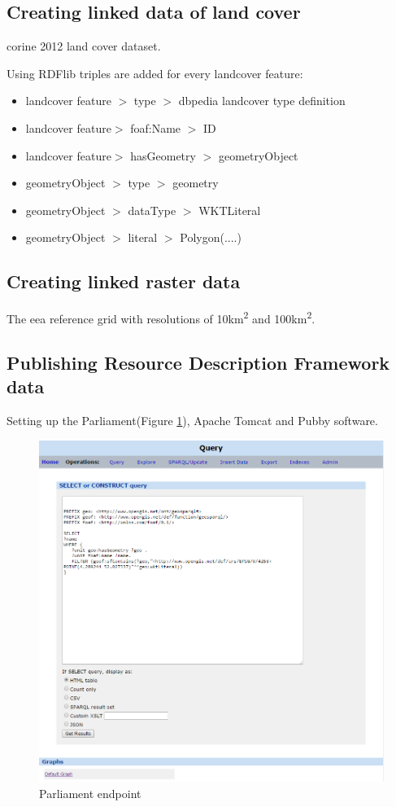 \subsection{Creating linked data of land cover}
\ac{corine} 2012 land cover dataset. 

Using RDFlib triples are added for every landcover feature: 
\begin{itemize}
	\item landcover feature $>$ type $>$ dbpedia landcover type definition
	\item landcover feature$>$ foaf:Name $>$ ID
	\item landcover feature$>$ hasGeometry $>$ geometryObject
	\item geometryObject $>$ type $>$ geometry
	\item geometryObject $>$ dataType $>$ WKTLiteral
	\item geometryObject $>$ literal $>$ Polygon(....)
\end{itemize}

\subsection{Creating linked raster data}
The \ac{eea} reference grid with resolutions of 10km\textsuperscript{2} and 100km\textsuperscript{2}.

\subsection{Publishing Resource Description Framework data}
Setting up the Parliament(Figure \ref{fig:Parliament}), Apache Tomcat and Pubby software.

\begin{figure}
	\includegraphics[width=\linewidth]{figs/Parliament.PNG}
	\caption{Parliament endpoint}
	\label{fig:Parliament}
\end{figure}

